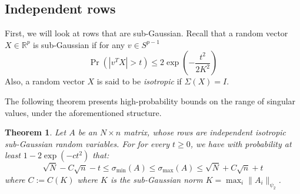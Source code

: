 \documentclass{article}
\newtheorem{theorem}{Theorem}[subsection]
\theoremstyle{remark}
\newcommand{\real}{\mathbb{R}}
\begin{document}
\subsection{Independent rows}
First, we will look at rows that are sub-Gaussian. Recall that a random vector \(X \in \real^{p}\) is sub-Gaussian if for any \(v \in S^{p - 1}\)
\begin{equation*}
\Pr(|v^{T}X| > t) \leq 2\exp\left(-\frac{t^{2}}{2K^{2}}\right)
\end{equation*}
Also, a random vector \(X\) is said to be \emph{isotropic} if \(\Sigma(X) = I\).

The following theorem presents high-probability bounds on the range of singular values, under the aforementioned structure.
\begin{theorem}
Let \(A\) be an \(N \times n\) matrix, whose rows are independent isotropic sub-Gaussian random variables. For for every \(t \geq 0\), we have with probability at least \(1 - 2\exp(-ct^{2})\) that:
\begin{equation*}
\sqrt{N} - C\sqrt{n} - t \leq \sigma_{\min}(A) \leq \sigma_{\max}(A) \leq \sqrt{N} + C\sqrt{n} + t
\end{equation*}
where \(C := C(K)\) where \(K\) is the sub-Gaussian norm \(K = \max_{i} \|A_{i}\|_{\psi_{2}}\).
\end{theorem}
\end{document}
